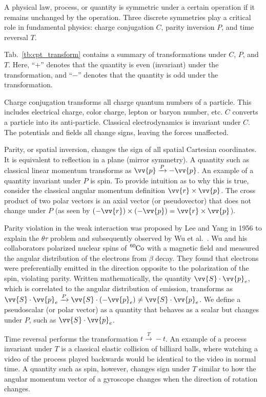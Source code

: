 A physical law, process, or quantity is symmetric under a certain operation if it remains unchanged by the operation. Three discrete symmetries play a critical role in fundamental physics: charge conjugation $C$, parity inversion $P$, and time reversal $T$.

Tab.~\ref{tb:cpt_transform} contains a summary of transformations under $C$, $P$, and $T$. Here, ``$+$'' denotes that the quantity is even (invariant) under the transformation, and ``$-$'' denotes that the quantity is odd under the transformation.

Charge conjugation transforms all charge quantum numbers of a particle. This includes electrical charge, color charge, lepton or baryon number, etc. $C$ converts a particle into its anti-particle. Classical electrodynamics is invariant under $C$. The potentials and fields all change signs, leaving the forces unaffected.

Parity, or spatial inversion, changes the sign of all spatial Cartesian coordinates. It is equivalent to reflection in a plane (mirror symmetry). A quantity such as classical linear momentum transforms as $\vv{p}\xrightarrow{P} -\vv{p}$. An example of a quantity invariant under $P$ is spin. To provide intuition as to why this is true, consider the classical angular momentum definition $\vv{r} \times \vv{p}$. The cross product of two polar vectors is an axial vector (or pseudovector) that does not change under $P$ (as seen by $(-\vv{r}) \times (-\vv{p}) = \vv{r} \times \vv{p}$).

Parity violation in the weak interaction was proposed by Lee and Yang in 1956 \cite{lee_yang_1956} to explain the $\theta$\textendash$\tau$ problem and subsequently observed by Wu et al.~\cite{wu_1956}. Wu and his collaborators polarized nuclear spins of $\ce{^{60}Co}$ with a magnetic field and measured the angular distribution of the electrons from $\beta$ decay. They found that electrons were preferentially emitted in the direction opposite to the polarization of the spin, violating parity. Written mathematically, the quantity $\vv{S}\cdot\vv{p}_e$, which is correlated to the angular distribution of emission, transforms as $\vv{S}\cdot\vv{p}_e \xrightarrow{P} \vv{S}\cdot(-\vv{p}_e) \neq \vv{S}\cdot\vv{p}_e$. We define a pseudoscalar (or polar vector) as a quantity that behaves as a scalar but changes under $P$, such as $\vv{S}\cdot\vv{p}_e$.

Time reversal performs the transformation $t \xrightarrow{T} -t$. An example of a process invariant under $T$ is a classical elastic collision of billiard balls, where watching a video of the process played backwards would be identical to the video in normal time. A quantity such as spin, however, changes sign under $T$ similar to how the angular momentum vector of a gyroscope changes when the direction of rotation changes.

